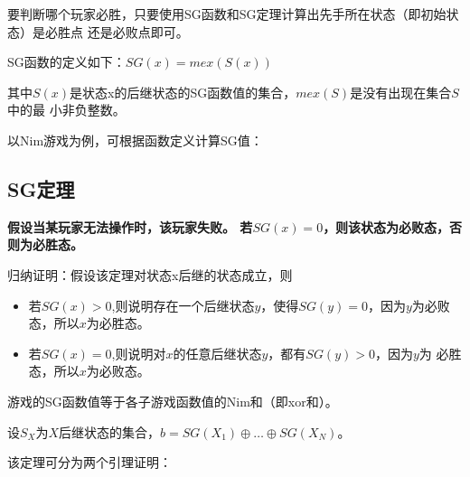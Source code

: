 要判断哪个玩家必胜，只要使用SG函数和SG定理计算出先手所在状态（即初始状态）是必胜点
还是必败点即可。

SG函数的定义如下：$SG(x)=mex(S(x))$

其中$S(x)$是状态x的后继状态的SG函数值的集合，$mex(S)$是没有出现在集合$S$中的最
小非负整数。

以Nim游戏为例，可根据函数定义计算SG值：



\subsection{SG定理}


\begin{theorem}
	\bfseries 假设当某玩家无法操作时，该玩家失败。\mdseries
	若$SG(x)=0$，则该状态为必败态，否则为必胜态。
\end{theorem}

归纳证明：假设该定理对状态x后继的状态成立，则

\begin{itemize}
	\item 若$SG(x)>0$,则说明存在一个后继状态$y$，使得$SG(y)=0$，因为$y$为必败
	      态，所以$x$为必胜态。
	\item 若$SG(x)=0$,则说明对$x$的任意后继状态$y$，都有$SG(y)>0$，因为$y$为
	      必胜态，所以$x$为必败态。
\end{itemize}

\begin{theorem}\label{SGB}
	游戏的SG函数值等于各子游戏函数值的Nim和（即xor和）。
\end{theorem}

设$S_X$为$X$后继状态的集合，$b=SG(X_1)\oplus \ldots \oplus SG(X_N)$。

该定理可分为两个引理证明：

